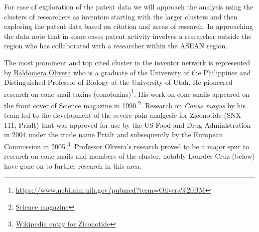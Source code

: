 \documentclass[]{book}
\theoremstyle{definition}
\theoremstyle{definition}
\theoremstyle{definition}
\theoremstyle{remark}
\begin{document}
For ease of exploration of the patent data we will approach the analysis
using the clusters of researchers as inventors starting with the larger
clusters and then exploring the patent data based on citation and areas
of research. In approaching the data note that in some cases patent
activity involves a researcher outside the region who has collaborated
with a researcher within the ASEAN region.

The most prominent and top cited cluster in the inventor network is
represented by
\href{https://en.wikipedia.org/wiki/Baldomero_Olivera}{Baldomera
Olivera} who is a graduate of the University of the Philippines and
Distinguished Professor of Biology at the University of Utah. He
pioneered research on cone snail toxins (conotoxins)\footnote{\url{https://www.ncbi.nlm.nih.gov/pubmed?term=Olivera\%20BM}}.
His work on cone snails appeared on the front cover of Science magazine
in 1990.\footnote{\href{http://science.sciencemag.org/content/249/4966}{Science
  magazine}}. Research on \emph{Conus magus} by his team led to the
development of the severe pain analgesic for Ziconotide (SNX-111;
Prialt) that was approved for use by the US Food and Drug Administration
in 2004 under the trade name Prialt and subsequently by the European
Commission in 2005.\footnote{\href{https://en.wikipedia.org/wiki/Ziconotide}{Wikipedia
  entry for Ziconotide}}. Professor Olivera's research proved to be a
major spur to research on cone snails and members of the cluster,
notably Lourdes Cruz (below) have gone on to further research in this
area.
\end{document}
